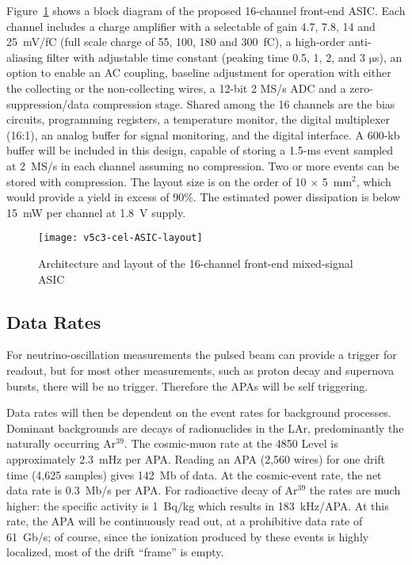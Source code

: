 Figure~\ref{fig:tpc-elec-asic-layout} shows a block diagram of the proposed 16-channel front-end
ASIC. Each channel includes a charge amplifier with a selectable of
gain 4.7, 7.8, 14 and 25~mV/fC (full scale charge of 55, 100, 180 and
300~fC), a high-order anti-aliasing filter with adjustable time
constant (peaking time 0.5, 1, 2, and 3 $\mathrm{\mu}$s), an option to enable an AC
coupling, baseline adjustment for operation with either the collecting
or the non-collecting wires, a 12-bit 2 MS/s ADC and a zero-suppression/data
compression stage. Shared among the 16 channels are the bias circuits,
programming registers, a temperature monitor, the digital multiplexer (16:1), an
analog buffer for signal monitoring, and the digital interface. A 600-kb 
buffer will be included in this design, capable of storing a 1.5-ms 
event sampled at 2~MS/s in each channel assuming no compression. Two or
more events can be stored with compression. The layout size is on the
order of 10 $\times$ 5~mm${^2}$, which would provide a
yield in excess of 90\%. The estimated power dissipation is below 15~mW
per channel at 1.8~V supply.

\begin{figure}[htbp]
\centering
\texttt{[image: v5c3-cel-ASIC-layout]}
\caption{Architecture and layout of the 16-channel front-end mixed-signal ASIC}
\label{fig:tpc-elec-asic-layout}
\end{figure}

\subsection{Data Rates}

For neutrino-oscillation measurements the pulsed beam can provide a
trigger for readout, but for most other measurements, such as proton decay
and supernova bursts, there will be no trigger.  Therefore the APAs will be
self triggering.  

Data rates will then
be dependent on the event rates for background processes.  Dominant
backgrounds are decays of radionuclides in the LAr,
predominantly the naturally occurring Ar$^{39}$.  The cosmic-muon rate at the 4850 Level is approximately 2.3~mHz per APA.  Reading an APA (2,560 wires) for
one drift time (4,625 samples) gives 142~Mb of data. At the cosmic-event rate,
the net data rate is 0.3~Mb/s per APA.  For radioactive decay of Ar$^{39}$
the rates are much higher: the specific activity is 1~Bq/kg which results in 183~kHz/APA.
At this rate, the APA will be continuously read out, at a prohibitive data
rate of 61~Gb/s; of course, since the ionization produced by these events is highly localized,
most of the drift ``frame'' is empty.

